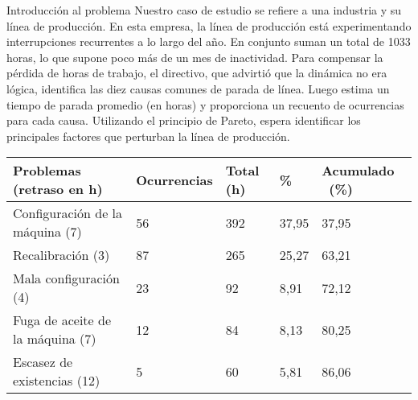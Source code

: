 \documentclass{article}
\theoremstyle{mytheoremstyle}
\theoremstyle{mytheoremstyle}
\theoremstyle{myproblemstyle}
\begin{document}
\begin{enumerate}
\begin{itemize}
Introducción al problema\newline
Nuestro caso de estudio se refiere a una industria y su línea de
producción. En esta empresa, la línea de producción está
experimentando interrupciones recurrentes a lo largo del año. En conjunto
suman un total de 1033 horas, lo que supone poco más de un
mes de inactividad. Para compensar la pérdida de horas de trabajo,
el directivo, que advirtió que la dinámica no era lógica,
identifica las diez causas comunes de parada de línea. Luego estima
un tiempo de parada promedio (en horas) y proporciona un recuento
de ocurrencias para cada causa. Utilizando el principio de
Pareto, espera identificar los principales factores que perturban la línea
de producción.
\begin{table}[h!]
	\begin{tabular}{|l|l|l|l|l|}
	\hline 
	\multicolumn{1}{|p{155.83218pt}}{\raggedright Problemas (retraso en h)} & \multicolumn{1}{|p{61.730625pt}}{\raggedright Ocurrencias} & \multicolumn{1}{|p{48.18pt}}{\raggedright Total (h)} & \multicolumn{1}{|p{41.404686pt}}{\raggedright \%} & \multicolumn{1}{|p{60.225pt}|}{\raggedright Acumulado \ (\%)}\\ 
	\hline 
	\multicolumn{1}{|p{155.83218pt}}{\raggedright Configuraci\'on de la m\'aquina (7)} & \multicolumn{1}{|p{61.730625pt}}{\raggedright 56} & \multicolumn{1}{|p{48.18pt}}{\raggedright 392} & \multicolumn{1}{|p{41.404686pt}}{\raggedright 37,95} & \multicolumn{1}{|p{60.225pt}|}{\raggedright 37,95}\\ 
	\hline 
	\multicolumn{1}{|p{155.83218pt}}{\raggedright Recalibraci\'on (3)} & \multicolumn{1}{|p{61.730625pt}}{\raggedright 87} & \multicolumn{1}{|p{48.18pt}}{\raggedright 265} & \multicolumn{1}{|p{41.404686pt}}{\raggedright 25,27} & \multicolumn{1}{|p{60.225pt}|}{\raggedright 63,21}\\ 
	\hline 
	\multicolumn{1}{|p{155.83218pt}}{\raggedright Mala configuraci\'on (4)} & \multicolumn{1}{|p{61.730625pt}}{\raggedright 23} & \multicolumn{1}{|p{48.18pt}}{\raggedright 92} & \multicolumn{1}{|p{41.404686pt}}{\raggedright 8,91} & \multicolumn{1}{|p{60.225pt}|}{\raggedright 72,12}\\ 
	\hline 
	\multicolumn{1}{|p{155.83218pt}}{\raggedright Fuga de aceite de la m\'aquina (7)} & \multicolumn{1}{|p{61.730625pt}}{\raggedright 12} & \multicolumn{1}{|p{48.18pt}}{\raggedright 84} & \multicolumn{1}{|p{41.404686pt}}{\raggedright 8,13} & \multicolumn{1}{|p{60.225pt}|}{\raggedright 80,25}\\ 
	\hline 
	\multicolumn{1}{|p{155.83218pt}}{\raggedright Escasez de existencias (12)} & \multicolumn{1}{|p{61.730625pt}}{\raggedright 5} & \multicolumn{1}{|p{48.18pt}}{\raggedright 60} & \multicolumn{1}{|p{41.404686pt}}{\raggedright 5,81} & \multicolumn{1}{|p{60.225pt}|}{\raggedright 86,06}\\ 

\end{tabular}
\end{table}
\end{itemize}
\end{enumerate}
\end{document}
